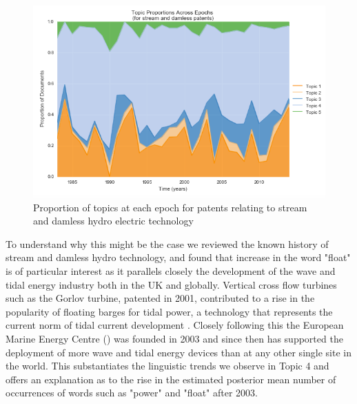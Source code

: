 \begin{figure}[!htb]
\centering
\includegraphics[width=130mm,scale=0.45]{Figures/areaplot2}
\decoRule
\caption[areaplot]{Proportion of topics at each epoch for patents relating to stream and damless hydro electric technology}
\label{fig:areaplot}
\end{figure}

To understand why this might be the case we reviewed the known history of stream and damless hydro technology, and found that increase in the word "float" is of particular interest as it parallels closely the development of the wave and tidal energy industry both in the UK and globally. Vertical cross flow turbines such as the Gorlov turbine, patented in 2001, contributed to a rise in the popularity of floating barges for tidal power, a technology that represents the current norm of tidal current development \parencite{KhanOES}. Closely following this the European Marine Energy Centre () was founded in 2003 and since then has supported the deployment of more wave and tidal energy devices than at any other single site in the world. This substantiates the linguistic trends we observe in Topic 4 and offers an explanation as to the rise in the estimated posterior mean number of occurrences of words such as "power" and "float" after 2003.

